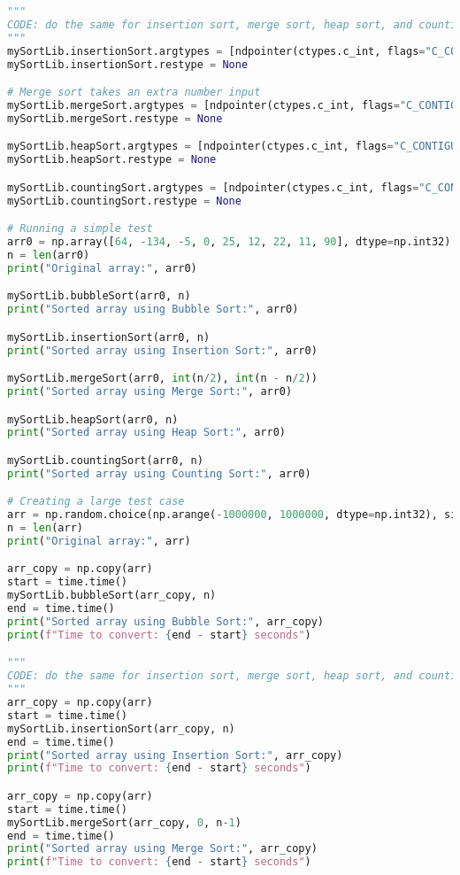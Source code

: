 \documentclass[12pt]{article}
\begin{document}
\begin{lstlisting}[language=python]
"""
CODE: do the same for insertion sort, merge sort, heap sort, and counting sort.
"""
mySortLib.insertionSort.argtypes = [ndpointer(ctypes.c_int, flags="C_CONTIGUOUS"), ctypes.c_int]
mySortLib.insertionSort.restype = None

# Merge sort takes an extra number input
mySortLib.mergeSort.argtypes = [ndpointer(ctypes.c_int, flags="C_CONTIGUOUS"), ctypes.c_int, ctypes.c_int]
mySortLib.mergeSort.restype = None

mySortLib.heapSort.argtypes = [ndpointer(ctypes.c_int, flags="C_CONTIGUOUS"), ctypes.c_int]
mySortLib.heapSort.restype = None

mySortLib.countingSort.argtypes = [ndpointer(ctypes.c_int, flags="C_CONTIGUOUS"), ctypes.c_int]
mySortLib.countingSort.restype = None

# Running a simple test
arr0 = np.array([64, -134, -5, 0, 25, 12, 22, 11, 90], dtype=np.int32)
n = len(arr0)
print("Original array:", arr0)

mySortLib.bubbleSort(arr0, n)
print("Sorted array using Bubble Sort:", arr0)

mySortLib.insertionSort(arr0, n)
print("Sorted array using Insertion Sort:", arr0)

mySortLib.mergeSort(arr0, int(n/2), int(n - n/2))
print("Sorted array using Merge Sort:", arr0)

mySortLib.heapSort(arr0, n)
print("Sorted array using Heap Sort:", arr0)

mySortLib.countingSort(arr0, n)
print("Sorted array using Counting Sort:", arr0)

# Creating a large test case
arr = np.random.choice(np.arange(-1000000, 1000000, dtype=np.int32), size=500000, replace=False)
n = len(arr)
print("Original array:", arr)

arr_copy = np.copy(arr)
start = time.time()
mySortLib.bubbleSort(arr_copy, n)
end = time.time()
print("Sorted array using Bubble Sort:", arr_copy)
print(f"Time to convert: {end - start} seconds")

"""
CODE: do the same for insertion sort, merge sort, heap sort, and counting sort.
"""
arr_copy = np.copy(arr)
start = time.time()
mySortLib.insertionSort(arr_copy, n)
end = time.time()
print("Sorted array using Insertion Sort:", arr_copy)
print(f"Time to convert: {end - start} seconds")

arr_copy = np.copy(arr)
start = time.time()
mySortLib.mergeSort(arr_copy, 0, n-1)
end = time.time()
print("Sorted array using Merge Sort:", arr_copy)
print(f"Time to convert: {end - start} seconds")


\end{lstlisting}
\end{document}
